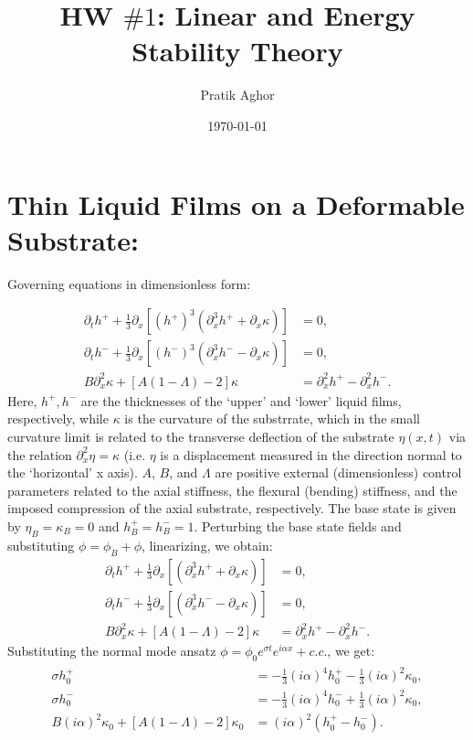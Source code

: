 \documentclass{article}
\author{Pratik Aghor}
\title{HW $\# 1$: Linear and Energy Stability Theory}
\date{\today}  %
\newcommand{\hp}{h^{+}}
\newcommand{\hm}{h^{-}}
\begin{document}
\maketitle
\section{Thin Liquid Films on a Deformable Substrate:}
Governing equations in dimensionless form:

\begin{align}\label{eq:gov_film_eqns}
 \partial_{t} \hp  + \frac{1}{3}\partial_{x}\left[ (\hp)^{3} (\partial^{3}_{x}\hp + \partial_{x}\kappa) \right] & = 0,\\
 \partial_{t} \hm  + \frac{1}{3}\partial_{x}\left[ (\hm)^{3} (\partial^{3}_{x}\hm - \partial_{x}\kappa) \right] & = 0,\\
 B\partial_{x}^{2}\kappa + [A(1-\Lambda)-2]\kappa & = \partial_{x}^{2}\hp - \partial_{x}^{2}\hm.
\end{align}
Here, $\hp, \hm$ are the thicknesses of the ‘upper’ and ‘lower’ liquid films, respectively, while $\kappa$ is the curvature of the substrrate, which in the small curvature limit is related to the transverse deflection of the substrate $\eta(x, t)$ via the relation $\partial_{x}^{2}\eta = \kappa$ (i.e. $\eta$ is a displacement measured in the direction normal to the ‘horizontal’ x axis). $A$, $B$, and $\Lambda$ are positive external (dimensionless) control parameters related to the axial stiffness, the flexural (bending) stiffness, and the imposed compression of the axial substrate, respectively.
%
The base state is given by $\eta_{B} = \kappa_{B} = 0$ and $\hp_{B} = \hm_{B} = 1$. Perturbing the base state fields and substituting $\phi = \phi_{B} + \phi$, linearizing, we obtain:
\begin{align}\label{eq:linearized_film_eqns}
 \partial_{t} \hp  + \frac{1}{3}\partial_{x}\left[  (\partial^{3}_{x}\hp + \partial_{x}\kappa) \right] & = 0,\\
 \partial_{t} \hm  + \frac{1}{3}\partial_{x}\left[  (\partial^{3}_{x}\hm - \partial_{x}\kappa) \right] & = 0,\\
 B\partial_{x}^{2}\kappa + [A(1-\Lambda)-2]\kappa & = \partial_{x}^{2}\hp - \partial_{x}^{2}\hm.
\end{align}
Substituting the normal mode ansatz $\phi = \phi_{0}e^{\sigma t}e^{i\alpha x} + c.c.$, we get:
\begin{align}
\begin{split}
 \sigma \hp_{0} & = - \frac{1}{3}(i\alpha)^{4}\hp_{0} - \frac{1}{3} (i\alpha)^{2} \kappa_{0}, \\
 \sigma \hm_{0} & = - \frac{1}{3}(i\alpha)^{4}\hm_{0} + \frac{1}{3} (i\alpha)^{2} \kappa_{0}, \\
 B(i\alpha)^{2}\kappa_{0} + [A(1-\Lambda)-2]\kappa_{0} &= (i\alpha)^{2}(\hp_{0} - \hm_{0}).
\end{split}
\end{align}
\end{document}
